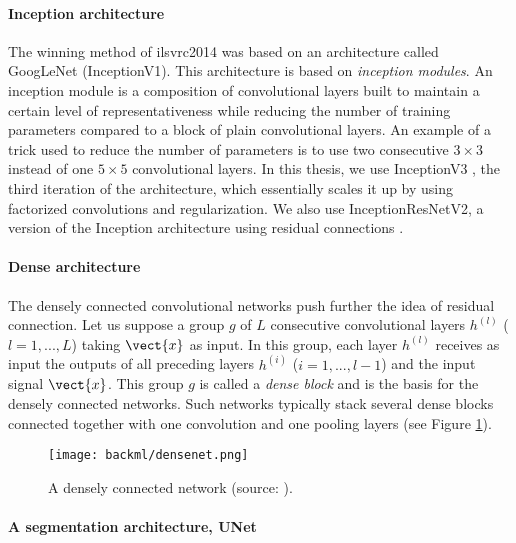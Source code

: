 \paragraph{Inception architecture}
\label{sssec:backml:arch:inception}
The winning method of \acrshort{ilsvrc}2014 was based on an architecture called
GoogLeNet \cite{szegedy2015going} (\aka InceptionV1). This architecture is
based on \textit{inception modules}. An inception module is a composition of
convolutional layers built to maintain a certain level of representativeness while
reducing the number of training parameters compared to a block of plain convolutional
layers. An example of a trick used to reduce the number of parameters is to use
two consecutive $3 \times 3$ instead of one $5 \times 5$ convolutional layers. In
this thesis, we use InceptionV3 \cite{szegedy2016rethinking}, the third
iteration of the architecture, which essentially scales it up by using factorized
convolutions and regularization. We also use InceptionResNetV2, a version of the
Inception architecture using residual connections
\cite{szegedy2017inception}.


\paragraph{Dense architecture}
\label{sssec:backml:arch:dense}
The densely connected convolutional networks \cite{huang2017densely} push
further the idea of residual connection. Let us suppose a group $g$ of $L$
consecutive convolutional layers $h^{(l)}$ ($l = 1, ..., L$) taking $\vect{x}$ as
input. In this group, each layer $h^{(l)}$ receives as input the outputs of all
preceding layers $h^{(i)}$ ($i = 1, ..., l-1$) and the input signal $\vect{x}$.
This group $g$ is called a \textit{dense block} and is the basis for the densely
connected networks. Such networks typically stack several dense blocks connected
together with one convolution and one pooling layers (see Figure
\ref{fig:backml:densenet}).

\begin{figure}
  \centering
  \texttt{[image: backml/densenet.png]}
  \caption{A densely connected network (source: \cite{huang2017densely}).}
  \label{fig:backml:densenet}
\end{figure}

\paragraph{A segmentation architecture, UNet}
\label{sssec:backml:arch:segment}

